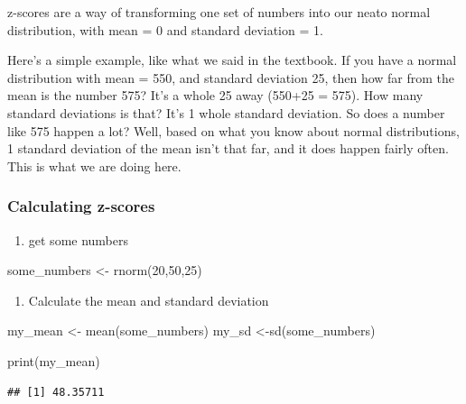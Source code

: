 \documentclass[
]{book}
\newenvironment{Shaded}{\begin{snugshade}}{\end{snugshade}}
\newcommand{\DecValTok}[1]{\textcolor[rgb]{0.00,0.00,0.81}{#1}}
\newcommand{\FunctionTok}[1]{\textcolor[rgb]{0.00,0.00,0.00}{#1}}
\newcommand{\NormalTok}[1]{#1}
\newcommand{\OtherTok}[1]{\textcolor[rgb]{0.56,0.35,0.01}{#1}}
\providecommand{\tightlist}{%
  \setlength{\itemsep}{0pt}\setlength{\parskip}{0pt}}
\begin{document}
z-scores are a way of transforming one set of numbers into our neato normal distribution, with mean = 0 and standard deviation = 1.

Here's a simple example, like what we said in the textbook. If you have a normal distribution with mean = 550, and standard deviation 25, then how far from the mean is the number 575? It's a whole 25 away (550+25 = 575). How many standard deviations is that? It's 1 whole standard deviation. So does a number like 575 happen a lot? Well, based on what you know about normal distributions, 1 standard deviation of the mean isn't that far, and it does happen fairly often. This is what we are doing here.

\hypertarget{calculating-z-scores}{%
\subsubsection{Calculating z-scores}\label{calculating-z-scores}}

\begin{enumerate}
\def\labelenumi{\arabic{enumi}.}
\tightlist
\item
  get some numbers
\end{enumerate}

\begin{Shaded}
\begin{Highlighting}[]
\NormalTok{some\_numbers }\OtherTok{\textless{}{-}} \FunctionTok{rnorm}\NormalTok{(}\DecValTok{20}\NormalTok{,}\DecValTok{50}\NormalTok{,}\DecValTok{25}\NormalTok{)}
\end{Highlighting}
\end{Shaded}

\begin{enumerate}
\def\labelenumi{\arabic{enumi}.}
\setcounter{enumi}{1}
\tightlist
\item
  Calculate the mean and standard deviation
\end{enumerate}

\begin{Shaded}
\begin{Highlighting}[]
\NormalTok{my\_mean }\OtherTok{\textless{}{-}} \FunctionTok{mean}\NormalTok{(some\_numbers)}
\NormalTok{my\_sd }\OtherTok{\textless{}{-}}\FunctionTok{sd}\NormalTok{(some\_numbers)}

\FunctionTok{print}\NormalTok{(my\_mean)}
\end{Highlighting}
\end{Shaded}

\begin{verbatim}
## [1] 48.35711
\end{verbatim}
\end{document}
